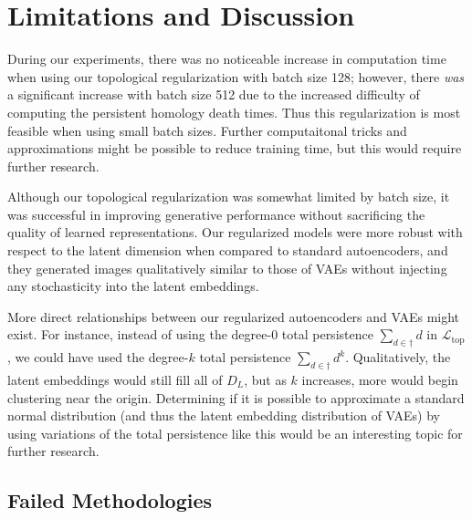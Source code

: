 \documentclass[conference]{IEEEtran}
\begin{document}
\section{Limitations and Discussion}

During our experiments, there was no noticeable increase in computation time when using our topological regularization with batch size 128; however, there \textit{was} a significant increase with batch size 512 due to the increased difficulty of computing the persistent homology death times. Thus this regularization is most feasible when using small batch sizes. Further computaitonal tricks and approximations might be possible to reduce training time, but this would require further research.

Although our topological regularization was somewhat limited by batch size, it was successful in improving generative performance without sacrificing the quality of learned representations. Our regularized models were more robust with respect to the latent dimension when compared to standard autoencoders, and they generated images qualitatively similar to those of VAEs without injecting any stochasticity into the latent embeddings.

More direct relationships between our regularized autoencoders and VAEs might exist. For instance, instead of using the degree-0 total persistence $\sum_{d \in \dagger}d$ in $\mathcal{L}_{\text{top}}$, we could have used the degree-$k$ total persistence $\sum_{d \in \dagger}d^{k}$. Qualitatively, the latent embeddings would still fill all of $D_{L}$, but as $k$ increases, more would begin clustering near the origin. Determining if it is possible to approximate a standard normal distribution (and thus the latent embedding distribution of VAEs) by using variations of the total persistence like this would be an interesting topic for further research.

\subsection{Failed Methodologies}
\end{document}
